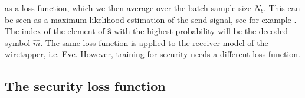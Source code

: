 \documentclass[conference]{IEEEtran}
\begin{document}
as a loss function, which we then average over the batch sample size $N_b$. This can be seen as a maximum likelihood estimation of the send signal, see for example \cite[Chap.~5]{Goodfellow:2016:DL:3086952}. The index of the element of $\hat{\mathbf{s}}$ with the highest probability will be the decoded symbol $\hat{m}$. The same loss function is applied to the receiver model of the wiretapper, i.e. Eve. However, training for security needs a different loss function.

\subsection{The security loss function}
\end{document}
